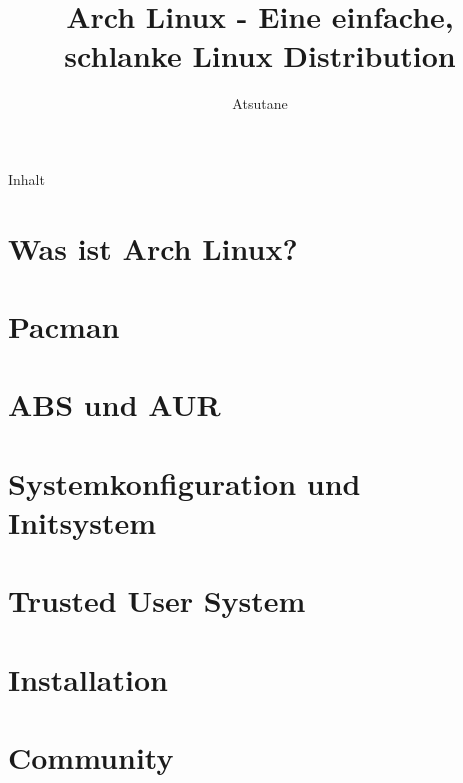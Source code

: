 \documentclass[mode=print,paper=screen,size=10pt,style=horatio]{powerdot}
\author{Atsutane}
\title{Arch Linux - Eine einfache, schlanke Linux Distribution}
\begin{document}
\maketitle
\begin{slide}{Inhalt}
  \tableofcontents[content=sections]
\end{slide}



\section{Was ist Arch Linux?}


\section{Pacman}


\section{ABS und AUR}


\section{Systemkonfiguration und Initsystem}


\section{Trusted User System}


\section{Installation}


\section{Community}

\end{document}
